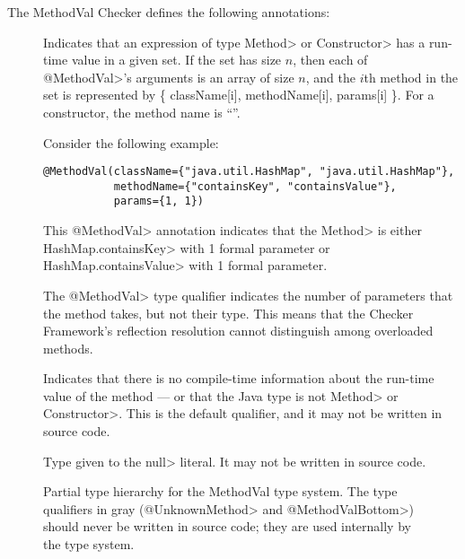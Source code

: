 
The MethodVal Checker defines the following annotations:

\begin{description}
\item[]
Indicates that an expression of type \<Method> or \<Constructor> has a
run-time value in a given set.  If the set has size $n$, then each of
\<@MethodVal>'s arguments is an array of size $n$, and the $i$th method in the set is
represented by \{ className[i], methodName[i], params[i] \}.
For a constructor, the method name is ``''.

Consider the following example:

\begin{Verbatim}
@MethodVal(className={"java.util.HashMap", "java.util.HashMap"},
           methodName={"containsKey", "containsValue"},
           params={1, 1})
\end{Verbatim}

\noindent
This \<@MethodVal> annotation indicates that the \<Method>
is either \<HashMap.containsKey> with 1 formal parameter or
\<HashMap.containsValue> with 1 formal parameter.

The \<@MethodVal> type qualifier indicates the number of
parameters that the method takes, but not their type.  This means that the
Checker Framework's reflection resolution cannot distinguish among
overloaded methods.

\item[] Indicates that there is no
  compile-time information about the run-time value of the method --- or
  that the Java type is not \<Method> or \<Constructor>.
  This is the default qualifier, and it may not be written in source code.

\item[] Type given to the \<null> literal.
  It may not be written in source code.
\end{description}

\begin{figure}
\caption{Partial type hierarchy for the MethodVal type system. The type qualifiers in gray (\<@UnknownMethod>
and \<@MethodValBottom>) should never be written in source code; they are used internally by the type system.}
\label{fig-methodval-hierarchy}
\end{figure}

